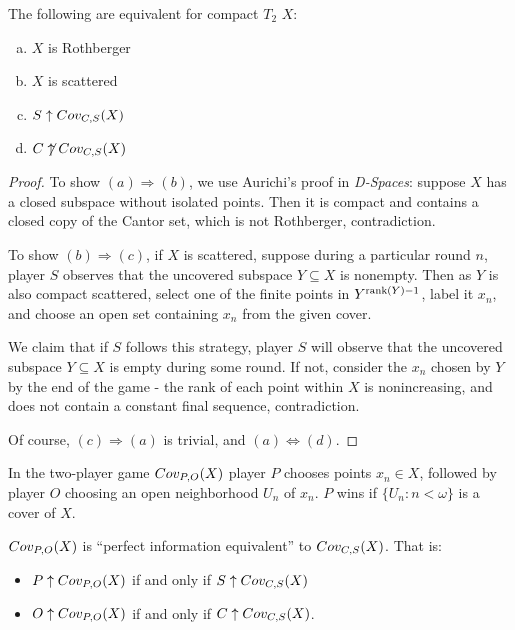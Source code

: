   \begin{theorem}
    The following are equivalent for compact $T_2$ $X$:
      \begin{enumerate}[(a)]
        \item $X$ is Rothberger
        \item $X$ is scattered
        \item $S\uparrow Cov_{C,S}(X)$
        \item $C\not\uparrow Cov_{C,S}(X)$
      \end{enumerate}
  \end{theorem}

  \begin{proof}
    To show $(a)\Rightarrow(b)$, we use Aurichi's proof in \textit{D-Spaces}: suppose $X$ has a closed subspace without isolated points. Then it is compact and contains a closed copy of the Cantor set, which is not Rothberger, contradiction.

    To show $(b)\Rightarrow(c)$, if $X$ is scattered, suppose during a particular round $n$, player $S$ observes that the uncovered subspace $Y \subseteq X$ is nonempty. Then as $Y$ is also compact scattered,  select one of the finite points in $Y^{\textrm{rank}(Y)-1}$, label it $x_n$, and choose an open set containing $x_n$ from the given cover.

    We claim that if $S$ follows this strategy, player $S$ will observe that the uncovered subspace $Y\subseteq X$ is empty during some round. If not, consider the $x_n$ chosen by $Y$ by the end of the game - the rank of each point within $X$ is nonincreasing, and does not contain a constant final sequence, contradiction.

    Of course, $(c)\Rightarrow(a)$ is trivial, and $(a)\Leftrightarrow(d)$.
  \end{proof}

  \begin{definition}
    In the two-player game $Cov_{P,O}(X)$ player $P$ chooses points $x_n\in X$, followed by player $O$ choosing an open neighborhood $U_n$ of $x_n$. $P$ wins if $\{U_n:n<\omega\}$ is a cover of $X$.
  \end{definition}

  \begin{theorem} $Cov_{P,O}(X)$ is ``perfect information equivalent'' to $Cov_{C,S}(X)$. That is:

    \begin{itemize}
      \item $P\uparrow Cov_{P,O}(X)$ if and only if $S\uparrow Cov_{C,S}(X)$
      \item $O\uparrow Cov_{P,O}(X)$ if and only if $C\uparrow Cov_{C,S}(X)$.
    \end{itemize}
  \end{theorem}

